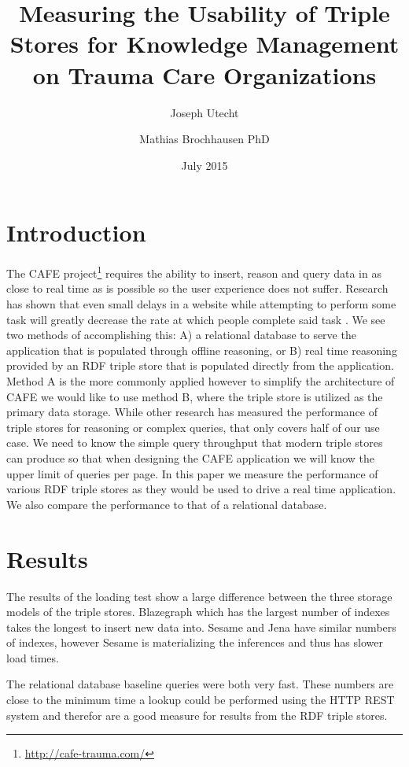 \documentclass{llncs}
\title{Measuring the Usability of Triple Stores for Knowledge Management on Trauma Care Organizations}
\author{Joseph Utecht \and Mathias Brochhausen PhD}
\institute{Department of Biomedical Informatics, University of Arkansas for Medical Sciences, Little Rock, AR}
\date{July 2015}
\begin{document}
\maketitle

\section{Introduction}

The CAFE project\footnote{\url{http://cafe-trauma.com/}} requires the ability to insert, reason and query data in as close to real time as is possible so the user experience does not suffer. Research has shown that even small delays in a website while attempting to perform some task will greatly decrease the rate at which people complete said task \cite{Galletta2002}.  We see two methods of accomplishing this: A) a relational database to serve the application that is populated through offline reasoning, or B) real time reasoning provided by an RDF triple store that is populated directly from the application. Method A is the more commonly applied however to simplify the architecture of CAFE we would like to use method B, where the triple store is utilized as the primary data storage. While other research has measured the performance of triple stores for reasoning or complex queries, that only covers half of our use case.  We need to know the simple query throughput that modern triple stores can produce so that when designing the CAFE application we will know the upper limit of queries per page. In this paper we measure the performance of various RDF triple stores as they would be used to drive a real time application. We also compare the performance to that of a relational database.

\section{Results}
The results of the loading test show a large difference between the three storage models of the triple stores.  Blazegraph which has the largest number of indexes takes the longest to insert new data into. Sesame and Jena have similar numbers of indexes, however Sesame is materializing the inferences and thus has slower load times.

The relational database baseline queries were both very fast. These numbers are close to the minimum time a lookup could be performed using the HTTP REST system and therefor are a good measure for results from the RDF triple stores. 
\end{document}
